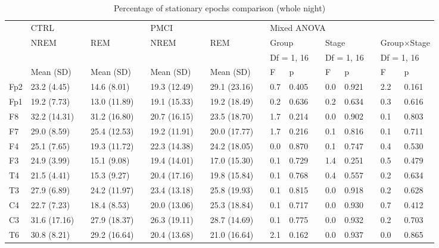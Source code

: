 \documentclass[10pt]{article}
\begin{document}
\setlength\tabcolsep{3pt}

\begin{table}
\caption{Percentage of stationary epochs comparison (whole night)}
\begin{small}
\begin{tabular}{lllllllllllllllll}
\toprule
 & \multicolumn{3}{l}{CTRL} & \phantom{.}  & \multicolumn{3}{l}{PMCI} & \phantom{.} & \multicolumn{8}{l}{Mixed ANOVA} \\
\cmidrule{2-4} \cmidrule{6-8} \cmidrule{10-17}
 & NREM &  & REM   & & NREM &  & REM  &  & 
   \multicolumn{2}{l}{Group} &  & \multicolumn{2}{l}{Stage} & & \multicolumn{2}{l}{Group$\times$Stage}  \\
 &&&&&&&&& \multicolumn{2}{l}{Df = 1, 16} &  &  \multicolumn{2}{l}{Df = 1, 16}  &  &  \multicolumn{2}{l}{Df = 1, 16}  \\
\cmidrule{2-2} \cmidrule{4-4} \cmidrule{6-6} \cmidrule{8-8} \cmidrule{10-11} \cmidrule{13-14} \cmidrule{16-17}    
 & Mean (SD) &  & Mean (SD) &  & Mean (SD) &  & Mean (SD) &  & F & p &  & F & p &  & F & p \\
\midrule
Fp2 &23.2 (4.45)&&14.6 (8.01)&&19.3 (12.49)&&29.1 (23.16)&&0.7 &0.405 & &0.0 &0.921 & &2.2 &0.161 \\
Fp1 &19.2 (7.73)&&13.0 (11.89)&&19.1 (15.33)&&19.2 (18.49)&&0.2 &0.636 & &0.2 &0.634 & &0.3 &0.616 \\
F8 &32.2 (14.31)&&31.2 (16.80)&&20.7 (16.15)&&23.5 (18.70)&&1.7 &0.214 & &0.0 &0.902 & &0.1 &0.803 \\
F7 &29.0 (8.59)&&25.4 (12.53)&&19.2 (11.91)&&20.0 (17.77)&&1.7 &0.216 & &0.1 &0.816 & &0.1 &0.711 \\
F4 &25.1 (7.65)&&19.3 (11.72)&&22.3 (14.38)&&24.2 (18.05)&&0.0 &0.870 & &0.1 &0.747 & &0.4 &0.530 \\
F3 &24.9 (3.99)&&15.1 (9.08)&&19.4 (14.01)&&17.0 (15.30)&&0.1 &0.729 & &1.4 &0.251 & &0.5 &0.479 \\
T4 &21.5 (4.41)&&15.3 (9.27)&&20.4 (17.16)&&19.8 (15.84)&&0.1 &0.768 & &0.4 &0.557 & &0.2 &0.634 \\
T3 &27.9 (6.89)&&24.2 (11.97)&&23.4 (13.18)&&25.8 (19.93)&&0.1 &0.815 & &0.0 &0.918 & &0.2 &0.628 \\
C4 &22.7 (7.23)&&18.4 (8.53)&&20.0 (13.06)&&25.3 (18.84)&&0.1 &0.717 & &0.0 &0.930 & &0.7 &0.412 \\
C3 &31.6 (17.16)&&27.9 (18.37)&&26.3 (19.11)&&28.7 (14.69)&&0.1 &0.775 & &0.0 &0.932 & &0.2 &0.703 \\
T6 &30.8 (8.21)&&29.2 (16.64)&&20.4 (13.68)&&21.0 (16.64)&&2.1 &0.162 & &0.0 &0.937 & &0.0 &0.865 \\

\end{tabular}
\end{small}
\end{table}
\end{document}
